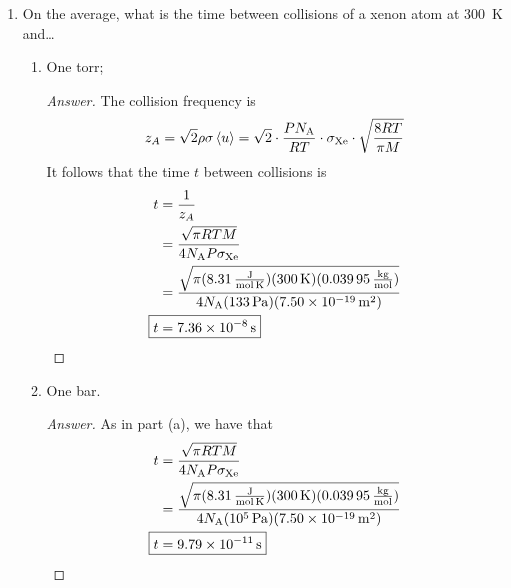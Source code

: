 \documentclass[../psets.tex]{subfiles}
\begin{document}
\begin{enumerate}[label={\textbf{27-\arabic*.}},leftmargin=3.5em]
\begin{proof}[Answer]
\begin{figure}[H]
\begin{subfigure}[b]{0.3\linewidth}
                \caption{3}
            \end{subfigure}
        \end{figure}
    \end{proof}
    \setcounter{enumi}{35}
    \item On the average, what is the time between collisions of a xenon atom at \SI{300}{\kelvin} and\dots
    \begin{enumerate}
        \item One torr;
        \begin{proof}[Answer]
            The collision frequency is
            \begin{equation*}
                z_A = \sqrt{2}\rho\sigma\prb{u}
                = \sqrt{2}\cdot\frac{P\NA}{RT}\cdot\sigma_{\ce{Xe}}\cdot\sqrt{\frac{8RT}{\pi M}}
            \end{equation*}
            It follows that the time $t$ between collisions is
            \begin{align*}
                t &= \frac{1}{z_A}\\
                &= \frac{\sqrt{\pi RTM}}{4\NA P\sigma_{\ce{Xe}}}\\
                &= \frac{\sqrt{\pi(\SI[per-mode=fraction]{8.31}{\joule\per\mole\per\kelvin})(\SI{300}{\kelvin})(\SI[per-mode=fraction]{0.03995}{\kilo\gram\per\mole})}}{4\NA(\SI{133}{\pascal})(\SI{7.50e-19}{\square\meter})}\\
                \Aboxed{t &= \SI{7.36e-8}{\second}}
            \end{align*}
        \end{proof}
        \item One bar.
        \begin{proof}[Answer]
            As in part (a), we have that
            \begin{align*}
                t &= \frac{\sqrt{\pi RTM}}{4\NA P\sigma_{\ce{Xe}}}\\
                &= \frac{\sqrt{\pi(\SI[per-mode=fraction]{8.31}{\joule\per\mole\per\kelvin})(\SI{300}{\kelvin})(\SI[per-mode=fraction]{0.03995}{\kilo\gram\per\mole})}}{4\NA(\SI{e5}{\pascal})(\SI{7.50e-19}{\square\meter})}\\
                \Aboxed{t &= \SI{9.79e-11}{\second}}
            \end{align*}

\end{proof}
\end{enumerate}
\end{enumerate}
\end{document}
